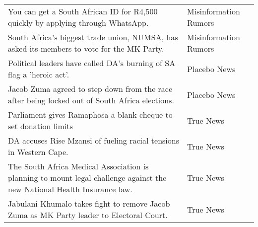 \begin{table}[H]
{\begin{tabular}[t]{>{\raggedright\arraybackslash}p{10cm}l}
\hspace{1em}You can get a South African ID for R4,500 quickly by applying through WhatsApp. & Misinformation Rumors\\
\hspace{1em}South Africa's biggest trade union, NUMSA, has asked its members to vote for the MK Party. & Misinformation Rumors\\
\hspace{1em}Political leaders have called DA's burning of SA flag a 'heroic act'. & Placebo News\\
\hspace{1em}Jacob Zuma agreed to step down from the race after being locked out of South Africa elections. & Placebo News\\
\hspace{1em}Parliament gives Ramaphosa a blank cheque to set donation limits & True News\\
\hspace{1em}DA accuses Rise Mzansi of fueling racial tensions in Western Cape. & True News\\
\hspace{1em}The South Africa Medical Association is planning to mount legal challenge against the new National Health Insurance law. & True News\\
\hspace{1em}Jabulani Khumalo takes fight to remove Jacob Zuma as MK Party leader to Electoral Court. & True News\\
\bottomrule
\end{tabular}}
\end{table}
